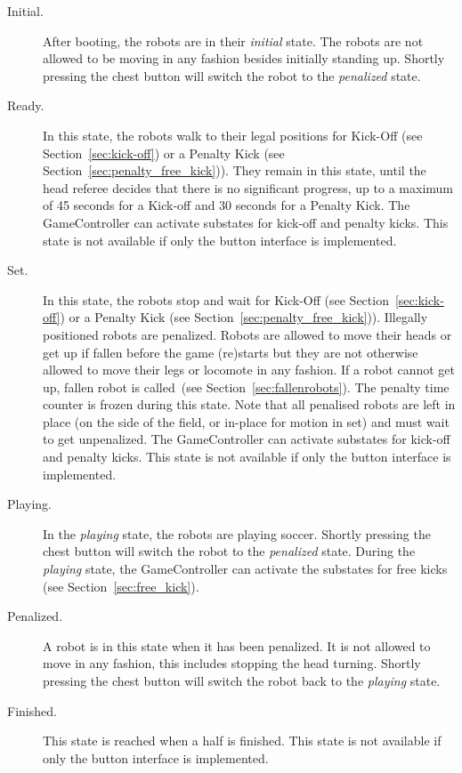 \documentclass[12pt]{article}
\newcommand{\cf}{see\xspace}
\newcommand{\KickOffAutoTime}{45 seconds\xspace}
\newcommand{\PenaltyFreeKickSetupTime}{30 seconds\xspace}
\begin{document}
\begin{description}

\item[Initial.] After booting, the robots are in their \emph{initial} state. The robots are not allowed to be moving in any fashion besides initially standing up. Shortly pressing the chest button will switch the robot to the \emph{penalized} state.

\item[Ready.] In this state, the robots walk to their legal positions for Kick-Off  (\cf Section~\ref{sec:kick-off}) or a Penalty Kick (\cf Section~\ref{sec:penalty_free_kick})). They remain in this state, until the head referee decides that there is no significant progress, up to a maximum of \KickOffAutoTime for a Kick-off and \PenaltyFreeKickSetupTime for a Penalty Kick. 
The GameController can activate substates for kick-off and penalty kicks.
This state is not available if only the button interface is implemented.

\item[Set.] In this state, the robots stop and wait for Kick-Off  (\cf Section~\ref{sec:kick-off}) or a Penalty Kick (\cf Section~\ref{sec:penalty_free_kick})). 
Illegally positioned robots are penalized. 
Robots are allowed to move their heads or get up if fallen before the game (re)starts but they are not otherwise allowed to move their legs or locomote in any fashion.
If a robot cannot get up, fallen robot is called~(\cf Section~\ref{sec:fallenrobots}).
The penalty time counter is frozen during this state.
Note that all penalised robots are left in place (on the side of the field, or in-place for motion in set) and must wait to get unpenalized.
The GameController can activate substates for kick-off and penalty kicks.
This state is not available if only the button interface is implemented.

\item[Playing.] In the \emph{playing} state, the robots are playing soccer. Shortly pressing the chest button will switch the robot to the \emph{penalized} state. During the \emph{playing} state, the GameController can activate the substates for free kicks (\cf Section~\ref{sec:free_kick}).

\item[Penalized.] A robot is in this state when it has been penalized. It is not allowed to move in any fashion,  this includes stopping the head turning. Shortly pressing the chest button will switch the robot back to the \emph{playing} state.

\item[Finished.] This state is reached when a half is finished. This state is not available if only the button interface is implemented.

\end{description}
\end{document}
